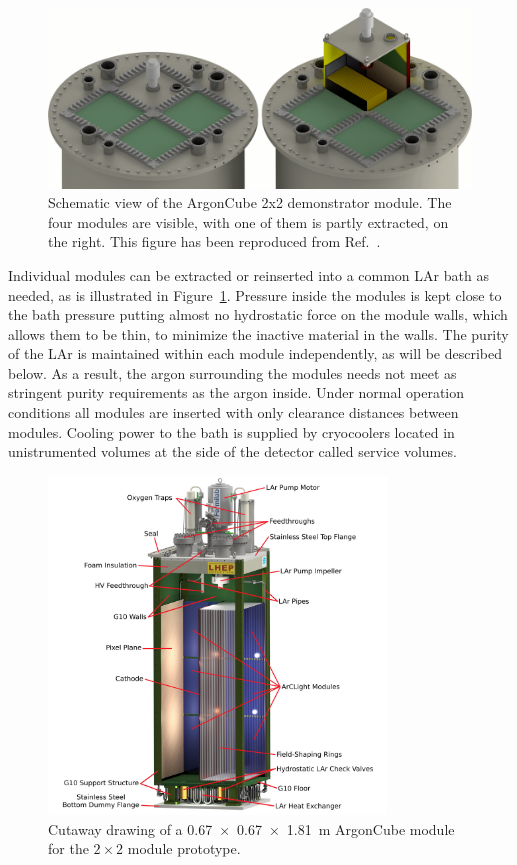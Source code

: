 \begin{figure}[htbp]
\centering
\includegraphics[width=\textwidth]{plots/DualBath.png}
\caption{Schematic view of the ArgonCube 2x2 demonstrator module. The four modules are visible, with one of them is partly extracted, on the right. This figure has been reproduced from Ref.~\cite{argoncube_loi}.}
\label{fig:2x2_extraction}
\end{figure}
Individual modules can be extracted or reinserted into a common LAr bath as needed, as is illustrated in Figure~\ref{fig:2x2_extraction}. Pressure inside the modules is kept close to the bath pressure putting almost no hydrostatic force on the module walls, which allows them to be thin, to minimize the inactive material in the walls. The purity of the LAr is maintained within each module independently, as will be described below. As a result, the argon surrounding the modules needs not meet as stringent purity requirements as the argon inside. Under normal operation conditions all modules are inserted with only clearance distances between modules. Cooling power to the bath is supplied by cryocoolers located in unistrumented volumes at the side of the detector called service volumes.

\begin{figure}[tbp]
  \centering
  \includegraphics[width=0.8\textwidth]{plots/Normal-Module-4K_labelled}
  \caption[ArgonCube module engineering drawing]{Cutaway drawing of a \SI{0.67 x 0.67 x 1.81}{\metre} ArgonCube module for the $2\times2$ module prototype. }
  \label{fig:ac_module}
\end{figure}

